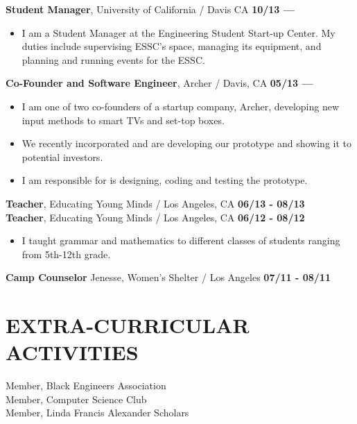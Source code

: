 \documentclass[line, margin, 10pt]{res} %
\begin{document}
\begin{resume}
{\bf Student Manager}, University of California / Davis CA
\hfill {\bf 10/13 ---}
\begin{itemize}[noitemsep,nolistsep] \itemsep -2pt %
    \item I am a Student Manager at the Engineering Student Start-up Center. My duties include supervising ESSC's space, managing its equipment, and planning and running events for the ESSC.
\end{itemize}

{\bf Co-Founder and Software Engineer}, Archer / Davis, CA
\hfill {\bf 05/13 ---}
\begin{itemize}[noitemsep,nolistsep] \itemsep -2pt %
    \item I am one of two co-founders of a startup company, Archer, developing new input methods to smart TVs and set-top boxes.
    \item We recently incorporated and are developing our prototype and showing it to potential investors.
    \item I am responsible for is designing, coding and testing the prototype.
\end{itemize}

{\bf Teacher}, Educating Young Minds / Los Angeles, CA
\hfill {\bf 06/13 - 08/13} \\
{\bf Teacher}, Educating Young Minds / Los Angeles, CA
\hfill {\bf 06/12 - 08/12}
\begin{itemize}[noitemsep,nolistsep] \itemsep -2pt %
\item
I taught grammar and mathematics to different classes of students ranging from 5th-12th grade.
\end{itemize}

{\bf Camp Counselor} Jenesse, Women's Shelter / Los Angeles
\hfill {\bf 07/11 - 08/11}




\section{EXTRA-CURRICULAR \\ ACTIVITIES} 

Member, Black Engineers Association \\
Member, Computer Science Club \\
Member, Linda Francis Alexander Scholars \\



\end{resume}
\end{document}
